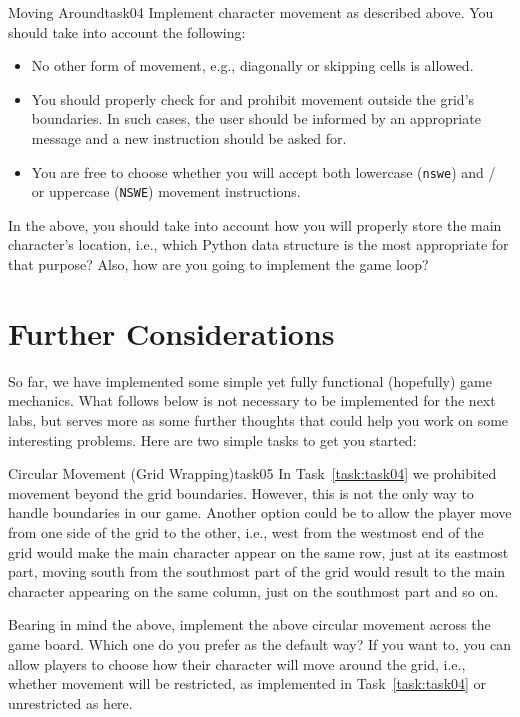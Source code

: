 \documentclass[a4paper, 11pt]{article}
\numberwithin{equation}{section}
\theoremstyle{definition}
\begin{document}
	\begin{task}{Moving Around}{task04}
		Implement character movement as described above. You should take into account the following:
		\begin{itemize}
			\item No other form of movement, e.g., diagonally or skipping cells is allowed.
			\item You should properly check for and prohibit movement outside the grid's boundaries. In such cases, the user should be informed by an appropriate message and a new instruction should be asked for.
			\item You are free to choose whether you will accept both lowercase (\texttt{nswe}) and / or uppercase (\texttt{NSWE}) movement instructions.
		\end{itemize}
		In the above, you should take into account how you will properly store the main character's location, i.e., which Python data structure is the most appropriate for that purpose? Also, how are you going to implement the game loop?
	\end{task}
	\section{Further Considerations}
	So far, we have implemented some simple yet fully functional (hopefully) game mechanics. What follows below is not necessary to be implemented for the next labs, but serves more as some further thoughts that could help you work on some interesting problems. Here are two simple tasks to get you started:
	\begin{task}{Circular Movement (Grid Wrapping)}{task05}
		In Task~\ref{task:task04} we prohibited movement beyond the grid boundaries. However, this is not the only way to handle boundaries in our game. Another option could be to allow the player move from one side of the grid to the other, i.e., west from the westmost end of the grid would make the main character appear on the same row, just at its eastmost part, moving south from the southmost part of the grid would result to the main character appearing on the same column, just on the southmost part and so on.
		
		Bearing in mind the above, implement the above circular movement across the game board. Which one do you prefer as the default way? If you want to, you can allow players to choose how their character will move around the grid, i.e., whether movement will be restricted, as implemented in Task~\ref{task:task04} or unrestricted as here.
	\end{task}
	
\end{document}
